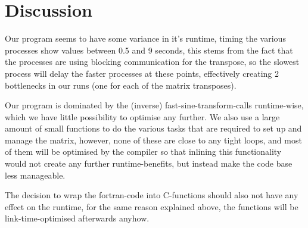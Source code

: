 \section{Discussion}


Our program seems to have some variance in it's runtime, timing the various processes show values
between 0.5 and 9 seconds, this stems from the fact that the processes are using blocking communication
for the transpose, so the slowest process will delay the faster processes at these points, effectively creating
2 bottlenecks in our runs (one for each of the matrix transposes).

Our program is dominated by the (inverse) fast-sine-transform-calls runtime-wise, which we have little possibility
to optimise any further. We also use a large amount of small functions to do the various tasks that are required to
set up and manage the matrix, however, none of these are close to any tight loops, and most of them will be optimised
by the compiler so that inlining this functionality would not create any further runtime-benefits, but instead make the
code base less manageable.

The decision to wrap the fortran-code into C-functions should also not have any effect on the runtime, for the same reason
explained above, the functions will be link-time-optimised afterwards anyhow.
